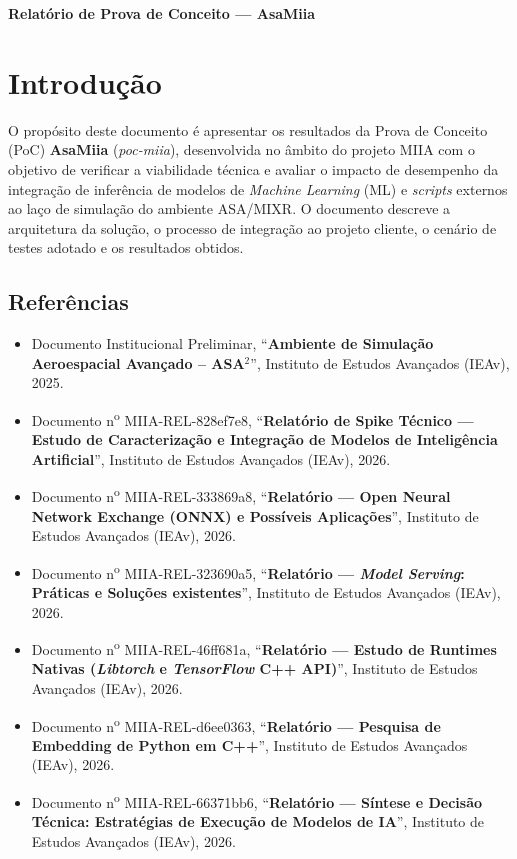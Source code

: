 \begin{center}
    \textbf{\Huge{Relatório de Prova de Conceito --- AsaMiia}}
\end{center}

\section{Introdução}

O propósito deste documento é apresentar os resultados da Prova de Conceito (PoC) \textbf{AsaMiia} (\textit{poc-miia}), desenvolvida no âmbito do projeto MIIA com o objetivo de verificar a viabilidade técnica e avaliar o impacto de desempenho da integração de inferência de modelos de \textit{Machine Learning} (ML) e \textit{scripts} externos ao laço de simulação do ambiente ASA/MIXR. O documento descreve a arquitetura da solução, o processo de integração ao projeto cliente, o cenário de testes adotado e os resultados obtidos.

\subsection{Referências}

\begin{itemize}
    \item Documento Institucional Preliminar, ``\textbf{Ambiente de Simulação Aeroespacial Avançado -- ASA$^{2}$}'', Instituto de Estudos Avançados (IEAv), 2025.
    \item Documento n\textsuperscript{o} MIIA-REL-828ef7e8, ``\textbf{Relatório de Spike Técnico --- Estudo de Caracterização e Integração de Modelos de Inteligência Artificial}'', Instituto de Estudos Avançados (IEAv), 2026.
    \item Documento n\textsuperscript{o} MIIA-REL-333869a8, ``\textbf{Relatório --- Open Neural Network Exchange (ONNX) e Possíveis Aplicações}'', Instituto de Estudos Avançados (IEAv), 2026.
    \item Documento n\textsuperscript{o} MIIA-REL-323690a5, ``\textbf{Relatório --- \textit{Model Serving}: Práticas e Soluções existentes}'', Instituto de Estudos Avançados (IEAv), 2026.
    \item Documento n\textsuperscript{o} MIIA-REL-46ff681a, ``\textbf{Relatório --- Estudo de Runtimes Nativas (\textit{Libtorch} e \textit{TensorFlow} C++ API)}'', Instituto de Estudos Avançados (IEAv), 2026.
    \item Documento n\textsuperscript{o} MIIA-REL-d6ee0363, ``\textbf{Relatório --- Pesquisa de Embedding de Python em C++}'', Instituto de Estudos Avançados (IEAv), 2026.
    \item Documento n\textsuperscript{o} MIIA-REL-66371bb6, ``\textbf{Relatório --- Síntese e Decisão Técnica: Estratégias de Execução de Modelos de IA}'', Instituto de Estudos Avançados (IEAv), 2026.
\end{itemize}


